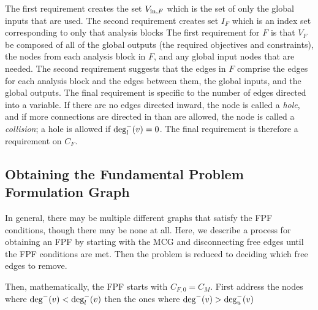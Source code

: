 The first requirement creates the set $V_{\textrm{in},F}$ which is the set of only the global inputs that are used.
The second requirement creates set $I_F$ which is an index set corresponding to only that analysis blocks
The first requirement for $F$ is that $V_F$ be composed of all of the global outputs (the required objectives and constraints), the nodes from each analysis block in $F$, and any global input nodes that are needed.
The second requirement suggests that the edges in $F$ comprise the edges for each analysis block and the edges between them, the global inputs, and the global outputs. 
The final requirement is specific to the number of edges directed into a variable. 
If there are no edges directed inward, the node is called a \emph{hole}, and if more connections are directed in than are allowed, the node is called a \emph{collision}; a hole is allowed if $\textrm{deg}_l^-(v)=0$. 
The final requirement is therefore a requirement on $C_F$.

\subsection{Obtaining the Fundamental Problem Formulation Graph}
In general, there may be multiple different graphs that satisfy the FPF conditions, though there may be none at all. Here, we describe a process for obtaining an FPF by starting with the MCG and disconnecting free edges until the FPF conditions are met. Then the problem is reduced to deciding which free edges to remove.

Then, mathematically, the FPF starts with $C_{F,0} = C_M$.
First address the nodes where $\textrm{deg}^-(v) < \textrm{deg}_l^-(v)$ then the ones where $\textrm{deg}^-(v) > \textrm{deg}_u^-(v)$

